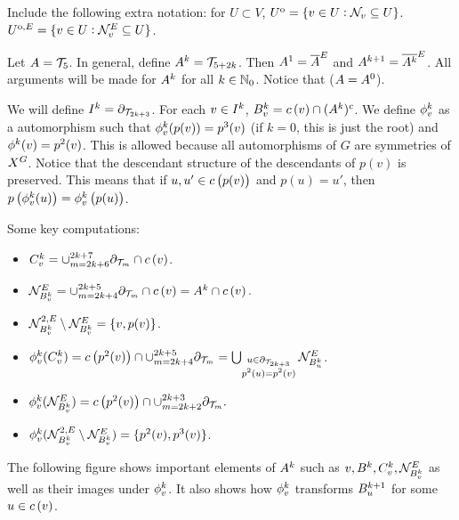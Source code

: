 \begin{description}
\ind Include the following extra notation: for \(U \subset V\), \({U}^\mathrm{o} = \{v \in U: \mathcal{N}_{v}\subseteq U\}\). \({U}^{\mathrm{o},E} = \{v \in U: \mathcal{N}^E_{v}\subseteq U\}\).

\ind Let \(A = \mathcal{T}_{5}\). In general, define \(A^{k} = \mathcal{T}_{5+2k}\). Then \(A^{1} = \overline{A}^E\) and \(A^{k+1} = \overline{A^{k}}^E\). All arguments will be made for \(A^{k}\) for all \(k \in \mathbb{N}_0\). Notice that (\(A = A^{0}\)).

\ind We will define \(I^{k} = \partial_{\mathcal{T}_{2k+3}}\). For each \(v \in I^{k}\), \(B^{k}_v = c\left(v\right)\cap (A^{k})^c\). We define \(\phi^{k}_v\) as a automorphism such that \(\phi^{k}_v(p(v)) = p^3(v)\) (if \(k=0\), this is just the root) and \(\phi^{k}(v) = p^2(v)\). This is allowed because all automorphisms of \(G\) are symmetries of \(X^{G}\). Notice that the descendant structure of the descendants of \(p(v)\) is preserved. This means that if \(u,u' \in c\left(p(v)\right)\) and \(p(u) = u'\), then \(p\left(\phi^{k}_v(u)\right) = \phi^{k}_v\left(p(u)\right)\).

 Some key computations:

\begin{itemize}
\item \(C^{k}_v = \cup_{m=2k+6}^{2k+7} \partial_{\mathcal{T}_{m}}\cap c\left(v\right)\).

\item \(\mathcal{N}^E_{B^{k}_v} = \cup_{m=2k+4}^{2k+5} \partial_{\mathcal{T}_{m}}\cap c\left(v\right) = A^{k}\cap c\left(v\right).\)

\item \(\mathcal{N}^{2,E}_{B^{k}_v}\setminus\mathcal{N}^E_{B^{k}_v} = \{v,p(v)\}\).

\item \(\phi^{k}_v(C^{k}_v) = c\left(p^2(v)\right)\cap\cup_{m=2k+4}^{2k+5} \partial_{\mathcal{T}_{m}} = \bigcup_{\substack{u \in \partial_{\mathcal{T}_{2k+3}}\\p^2(u) = p^2(v)}} \mathcal{N}^E_{B^{k}_u}\).

\item \(\phi^{k}_v(\mathcal{N}^E_{B^{k}_v}) = c\left(p^2(v)\right)\cap\cup_{m=2k+2}^{2k+3}\partial_{\mathcal{T}_{m}}.\)

\item \(\phi^{k}_v(\mathcal{N}^{2,E}_{B^{k}_v}\setminus\mathcal{N}^E_{B^{k}_v}) = \{p^2(v),p^3(v)\}\).
\end{itemize}

The following figure shows important elements of \(A^{k}\) such as \(v,B^{k},C^{k}_v,\mathcal{N}^E_{B^{k}_v}\) as well as their images under \(\phi^{k}_v\). It also shows how \(\phi^{k}_v\) transforms \(B^{k+1}_u\) for some \(u\in c\left(v\right)\).


\end{description}
